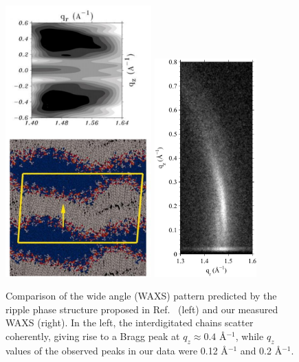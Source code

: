 \begin{figure}[htbp]
  \centering
  \includegraphics[width=0.5\textwidth]{figures/ripple/discussion/deVries_waxs}
  \qquad
  \includegraphics[width=0.35\textwidth]{figures/ripple/discussion/ripple_waxs}
  \caption{Comparison of the wide angle (WAXS) pattern predicted by the 
  ripple phase structure proposed in Ref.~\cite{ref:deVries05} (left) and
  our measured WAXS (right). In the left, the interdigitated chains scatter 
  coherently, giving rise to a Bragg peak at $q_z \approx 0.4$ \AA$^{-1}$,
  while $q_z$ values of the observed peaks in our data were 0.12 \AA$^{-1}$
  and 0.2 \AA$^{-1}$.}
  \label{fig:nGIWAXS_comparison}
\end{figure}

